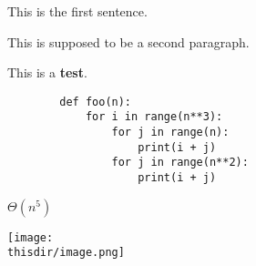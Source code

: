 \begin{prob}
    This is the first sentence.

    This is supposed to be a second paragraph.

    This is a \textbf{test}.

    \begin{verbatim}
        def foo(n):
            for i in range(n**3):
                for j in range(n):
                    print(i + j)
                for j in range(n**2):
                    print(i + j)
    \end{verbatim}

    \begin{soln}
        $\Theta(n^5)$

        \texttt{[image: \\thisdir/image.png]}
    \end{soln}

\end{prob}
